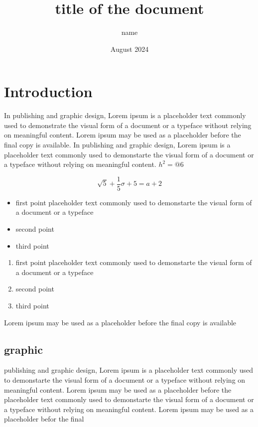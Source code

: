 \documentclass{article}
\title{title of the document}
\author{name}
\date{August 2024}
\begin{document}
\maketitle

\section{Introduction}
In publishing and graphic design, Lorem ipsum is a placeholder text commonly used to demonstrate the visual form of a document or a typeface without relying on meaningful content. Lorem ipsum may be used as a placeholder before the final copy is available. In publishing and graphic design, Lorem ipsum is a placeholder text commonly used to demonstarte the visual form of a document or a typeface without relying on meaningful content. $h^2 = @6$


\begin{equation}
    \sqrt{5} + \frac{1}{5}\sigma + 5 = a + 2
\end{equation}

\begin{itemize}
    \item first point placeholder text commonly used to demonstarte the visual form of a document or a typeface
    \item second point
    \item third point
\end{itemize}
\begin{enumerate}
    \item first point placeholder text commonly used to demonstarte the visual form of a document or a typeface
    \item second point
    \item third point
\end{enumerate}

Lorem ipsum may be used as a placeholder before the final copy is available

\subsection{graphic}
publishing and graphic design, Lorem ipsum is a placeholder text commonly used to demonstarte the visual form of a document or a typeface without relying on meaningful content. Lorem ipsum may be used as a placeholder before the placeholder text commonly used to demonstarte the visual form of a document or a typeface without relying on meaningful content. Lorem ipsum may be used as a placeholder befor the final
\end{document}
